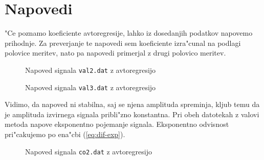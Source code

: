 \documentclass[a4paper,10pt]{article}
\begin{document}
\section{Napovedi}

"Ce poznamo koeficiente avtoregresije, lahko iz dosedanjih podatkov napovemo prihodnje. Za preverjanje te napovedi sem koeficiente izra"cunal na podlagi polovice meritev, nato pa napovedi primerjal z drugi polovico meritev. 

\begin{figure}[h]
 
 \caption{Napoved signala \texttt{val2.dat} z avtoregresijo}
 \label{fig:napoved-val2}
\end{figure}

\begin{figure}[h]
 
 \caption{Napoved signala \texttt{val3.dat} z avtoregresijo}
 \label{fig:napoved-val3}
\end{figure}

Vidimo, da napoved ni stabilna, saj se njena amplituda spreminja, kljub temu da je amplituda izvirnega signala pribli"zno konstantna. Pri obeh datotekah z valovi metoda napove eksponentno pojemanje signala. Eksponentno odvisnost pri"cakujemo po ena"cbi (\ref{eq:dif-exp}). 

\begin{figure}[h]
 
 \caption{Napoved signala \texttt{co2.dat} z avtoregresijo}
 \label{fig:napoved-co2}
\end{figure}

 
\end{document}
